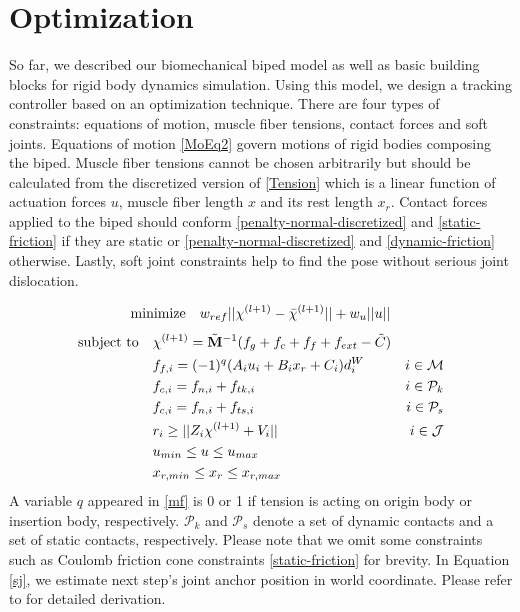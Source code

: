 \documentclass[master,english,final]{kaist-ucs}
\begin{document}
\section{Optimization}
So far, we described our biomechanical biped model as well as basic building blocks for rigid body dynamics
simulation.
Using this model, we design a tracking controller based on an optimization technique.
There are four types of constraints: equations of motion, muscle fiber tensions, contact forces and soft joints.
Equations of motion \eqref{MoEq2} govern motions of rigid bodies composing the biped.
Muscle fiber tensions cannot be chosen arbitrarily but should be calculated from the
discretized version of \eqref{Tension}
which is a linear function of actuation forces $u$, muscle fiber length $x$ and its rest length $x_r$.
Contact forces applied to the biped should conform \eqref{penalty-normal-discretized} and \eqref{static-friction} if
they are static or \eqref{penalty-normal-discretized} and \eqref{dynamic-friction} otherwise.
Lastly, soft joint constraints help to find the pose without serious joint dislocation.

\begin{equation}\notag
\text{minimize} \quad w_{ref} || \chi^{(l+1)} - \bar{\chi}^{(l+1)} || + w_u || u ||
\end{equation}
\begin{align}
\text{subject to} & \quad \chi^{(l+1)} = \tilde{\mathbf{M}}^{-1} (f_g + f_c + f_f + f_{ext} - \tilde{C})     &                      \notag\\
                  & \quad f_{f,i} = (-1)^{q} ( A_i u_i + B_i x_r + C_i ) d^W_i                      & i \in \mathcal{M}    \label{mf}\\
                  & \quad f_{c,i} = f_{n,i} + f_{tk, i}                                             & i \in \mathcal{P}_k  \notag\\
                  & \quad f_{c,i} = f_{n,i} + f_{ts, i}                                             & i \in \mathcal{P}_s  \notag\\
                  & \quad r_i \geq || Z_i \chi^{(l+1)} + V_i ||                                     & i \in \mathcal{J}    \label{sj}\\
                  & \quad u_{min}   \leq u   \leq u_{max}                                           &                      \notag\\
                  & \quad x_{r,min} \leq x_r \leq x_{r,max}                                         &                      \notag
\end{align}
A variable $q$ appeared in \eqref{mf} is 0 or 1
if tension is acting on origin body or insertion body, respectively.
$\mathcal{P}_k$ and $\mathcal{P}_s$ denote a set of dynamic contacts and a set of static contacts, respectively.
Please note that we omit some constraints such as Coulomb friction cone constraints \eqref{static-friction} for brevity.
In Equation \eqref{sj}, we estimate next step's joint anchor position in world coordinate.
Please refer to \cite{Jain:09:OIM} for detailed derivation.
\end{document}
